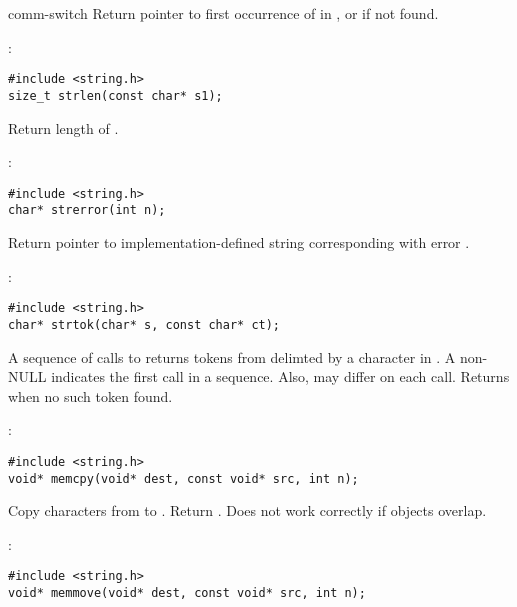 \begin{Ventry2}{comm-switch  }
     Return pointer to first occurrence of  in , or
      if not found.

\item[strlen]
\label{item:strlen}
:
\begin{production}
\begin{verbatim}
#include <string.h>
size_t strlen(const char* s1);
\end{verbatim}
\end{production}

     Return length of .

\item[strerror]
\label{item:strerror}
:
\begin{production}
\begin{verbatim}
#include <string.h>
char* strerror(int n);
\end{verbatim}
\end{production}

     Return pointer to implementation-defined string corresponding with error
     .

\item[strtok]
\label{item:strtok}
:
\begin{production}
\begin{verbatim}
#include <string.h>
char* strtok(char* s, const char* ct);
\end{verbatim}
\end{production}

     A sequence of calls to  returns tokens from 
     delimted by a character in . A non-NULL  indicates the
     first call in a sequence. Also, may differ on each
     call. Returns  when no such token found.

\item[memcpy]
\label{item:memcpy}
:
\begin{production}
\begin{verbatim}
#include <string.h>
void* memcpy(void* dest, const void* src, int n);
\end{verbatim}
\end{production}

     Copy  characters from  to . Return
     . Does not work correctly if objects overlap.

\item[memmove]
\label{item:memmove}
:
\begin{production}
\begin{verbatim}
#include <string.h>
void* memmove(void* dest, const void* src, int n);
\end{verbatim}
\end{production}


\end{Ventry2}
